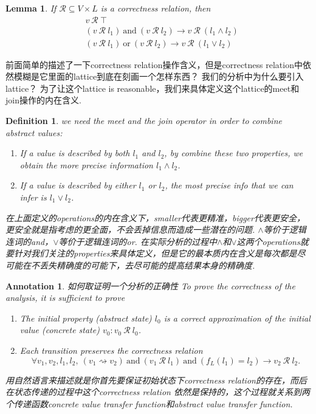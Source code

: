 \documentclass{article}
\newtheorem{lemma}[theorem]{Lemma}
\newtheorem{definition}[theorem]{Definition}
\newtheorem{annotation}[theorem]{Annotation}
\begin{document}
\begin{lemma}
\rm If $\mathcal{R} \subseteq V \times L$ is a correctness relation, then
$$
\begin{aligned}
& v~\mathcal{R}~\top \\
& (v~\mathcal{R}~l_1)~\text{and}~(v~\mathcal{R}~l_2) \rightarrow v~\mathcal{R}~(l_1 \wedge l_2) \\
& (v~\mathcal{R}~l_1)~\text{or}~(v~\mathcal{R}~l_2) \rightarrow v~\mathcal{R}~(l_1 \vee l_2)
\end{aligned}
$$
\end{lemma}

前面简单的描述了一下correctness relation操作含义，但是correctness relation中依然模糊是它里面的lattice到底在刻画一个怎样东西？ 我们的分析中为什么要引入lattice？ 为了让这个lattice is reasonable，我们来具体定义这个lattice的meet和join操作的内在含义.

\begin{definition}
\rm we need the meet and the join operator in order to combine abstract values: 
\begin{enumerate}
	\item If a value is described by both $l_1$ and $l_2$, by combine these two properties, we obtain the more precise information $l_1 \wedge l_2$.
	\item If a value is described by either $l_1$ or $l_2$, the most precise info that we can infer is $l_1 \vee l_2$. 
\end{enumerate}

{\color{blue}在上面定义的operations的内在含义下，smaller代表更精准，bigger代表更安全，更安全就是指考虑的更全面，不会丢掉信息而造成一些潜在的问题. $\wedge$等价于逻辑连词的and，$\vee$等价于逻辑连词的or. 在实际分析的过程中$\wedge$和$\vee$这两个operations就要针对我们关注的properties来具体定义，但是它的最本质内在含义是每次都是尽可能在不丢失精确度的可能下，去尽可能的提高结果本身的精确度}.
\end{definition}


\newpage
\begin{annotation}
\rm {\color{red} 如何取证明一个分析的正确性} To prove the correctness of the analysis, it is sufficient to prove 
\begin{enumerate}
	\item The initial property (abstract state) $l_0$ is a correct approximation of the initial value (concrete state) $v_0: v_0~\mathcal{R}~ l_0$.
	\item Each transition preserves the correctness relation
	$$
	\forall v_1,v_2,l_1,l_2,~(v_1 \rightsquigarrow v_2)~\text{and}~(v_1 ~\mathcal{R}~l_1)~\text{and}~(f_L(l_1) = l_2) \rightarrow v_2~\mathcal{R}~ l_2.
	$$
\end{enumerate}
{\color{blue} 用自然语言来描述就是你首先要保证初始状态下correctness relation的存在，而后在状态传递的过程中这个correctness relation 依然是保持的，这个过程就关系到两个传递函数concrete value transfer function和abstract value transfer function}.
\end{annotation}
\end{document}

